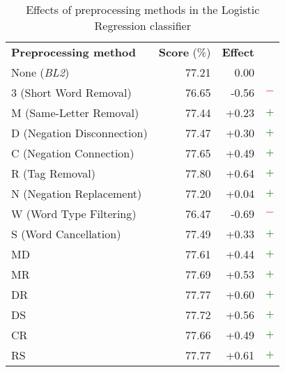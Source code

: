 \begin{table}
	\centering
	\begin{tabular}{| l | r | r | c}
		\cline{1-3}
		\textbf{Preprocessing method} & \textbf{Score} (\%) & \textbf{Effect} \\ \cline{1-3}
		None (\textit{BL2}) & 77.21 & 0.00 & \\ \cline{1-3}
		3 (Short Word Removal) & 76.65 & -0.56 & \textcolor{red}{$\bm{-}$} \\ \cline{1-3}
		M (Same-Letter Removal) & 77.44 & +0.23 & \textcolor{darkgreen}{$\bm{+}$} \\ \cline{1-3}
		D (Negation Disconnection) & 77.47 & +0.30 & \textcolor{darkgreen}{$\bm{+}$} \\ \cline{1-3}
		C (Negation Connection)	& 77.65 & +0.49 & \textcolor{darkgreen}{$\bm{+}$} \\ \cline{1-3}
		R (Tag Removal)	& 77.80 & +0.64 & \textcolor{darkgreen}{$\bm{+}$}  \\ \cline{1-3}
		N (Negation Replacement) & 77.20 & +0.04 & \textcolor{darkgreen}{$\bm{+}$} \\ \cline{1-3}
		W (Word Type Filtering) & 76.47 & -0.69 & \textcolor{red}{$\bm{-}$} \\ \cline{1-3}
		S (Word Cancellation) & 77.49 & +0.33 & \textcolor{darkgreen}{$\bm{+}$} \\ \cline{1-3}
		MD & 77.61 & +0.44 & \textcolor{darkgreen}{$\bm{+}$}\\ \cline{1-3}
		MR & 77.69 & +0.53& \textcolor{darkgreen}{$\bm{+}$} \\ \cline{1-3}
		DR & 77.77 & +0.60 & \textcolor{darkgreen}{$\bm{+}$}\\ \cline{1-3}
		DS & 77.72 & +0.56 & \textcolor{darkgreen}{$\bm{+}$}\\ \cline{1-3}
		CR & 77.66 & +0.49 & \textcolor{darkgreen}{$\bm{+}$}\\ \cline{1-3}
		RS & 77.77 & +0.61 & \textcolor{darkgreen}{$\bm{+}$}\\ \cline{1-3}
	\end{tabular}
	\caption{Effects of preprocessing methods in the Logistic Regression classifier}
	\label{tab:lr-prep-results-single}
\end{table}